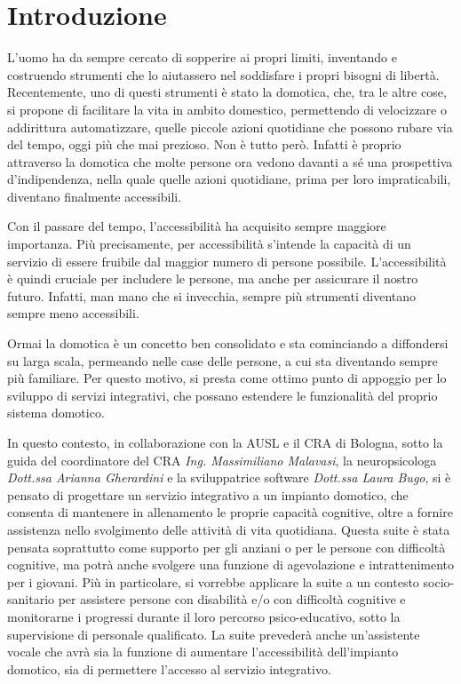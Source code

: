 
\chapter{Introduzione}

L’uomo ha da sempre cercato di sopperire ai propri limiti, inventando e
costruendo strumenti che lo aiutassero nel soddisfare i propri bisogni di
libertà. Recentemente, uno di questi strumenti è stato la domotica, che, tra le
altre cose, si propone di facilitare la vita in ambito domestico, permettendo
di velocizzare o addirittura automatizzare, quelle piccole azioni quotidiane
che possono rubare via del tempo, oggi più che mai prezioso. Non è tutto però.
Infatti è proprio attraverso la domotica che molte persone ora vedono davanti a
sé una prospettiva d'indipendenza, nella quale quelle azioni quotidiane, prima
per loro impraticabili, diventano finalmente accessibili.

Con il passare del tempo, l’accessibilità ha acquisito sempre maggiore
importanza. Più precisamente, per accessibilità s’intende la capacità di un
servizio di essere fruibile dal maggior numero di persone possibile.
L’accessibilità è quindi cruciale per includere le persone, ma anche per
assicurare il nostro futuro. Infatti, man mano che si invecchia, sempre più
strumenti diventano sempre meno accessibili.

Ormai la domotica è un concetto ben consolidato e sta cominciando a diffondersi
su larga scala, permeando nelle case delle persone, a cui sta diventando sempre
più familiare. Per questo motivo, si presta come ottimo punto di appoggio per
lo sviluppo di servizi integrativi, che possano estendere le funzionalità del
proprio sistema domotico.

In questo contesto, in collaborazione con la AUSL \cite{AUSL} e il CRA
\cite{CRA} di Bologna, sotto la guida del coordinatore del CRA \textit{Ing.
Massimiliano Malavasi}, la neuropsicologa \textit{Dott.ssa Arianna Gherardini}
e la sviluppatrice software \textit{Dott.ssa Laura Bugo}, si è pensato di
progettare un servizio integrativo a un impianto domotico, che consenta di
mantenere in allenamento le proprie capacità cognitive, oltre a fornire
assistenza nello svolgimento delle attività di vita quotidiana. Questa suite è
stata pensata soprattutto come supporto per gli anziani o per le persone con
difficoltà cognitive, ma potrà anche svolgere una funzione di agevolazione e
intrattenimento per i giovani. Più in particolare, si vorrebbe applicare la
suite a un contesto socio-sanitario per assistere persone con disabilità e/o
con difficoltà cognitive e monitorarne i progressi durante il loro percorso
psico-educativo, sotto la supervisione di personale qualificato. La suite
prevederà anche un’assistente vocale che avrà sia la funzione di aumentare
l’accessibilità dell’impianto domotico, sia di permettere l’accesso al servizio
integrativo.

